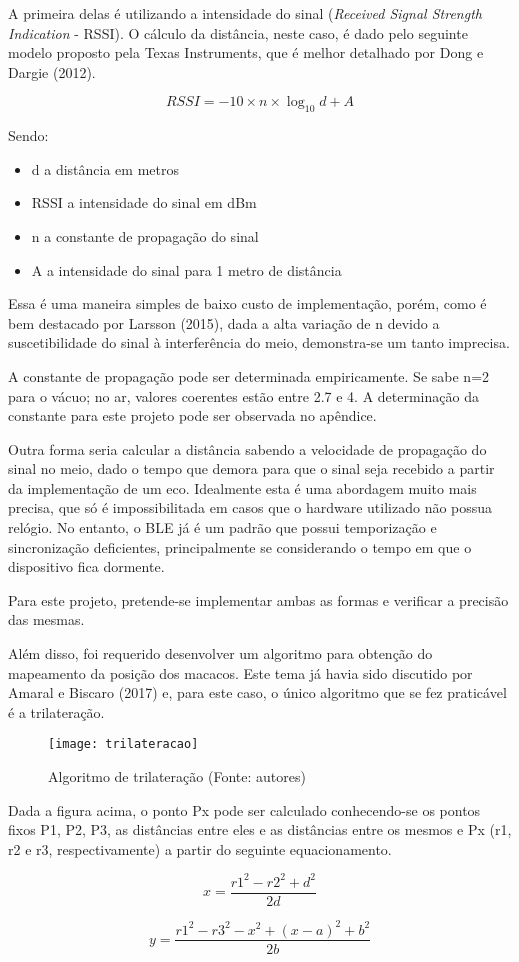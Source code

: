 A primeira delas é utilizando a intensidade do sinal (\textit{Received Signal Strength Indication} - RSSI). O cálculo da distância, neste caso, é dado pelo seguinte modelo proposto pela Texas Instruments, que é melhor detalhado por Dong e Dargie (2012).

\begin{equation}
RSSI = -10 \times n \times \log_{10} d + A
\end{equation}

Sendo:
\begin{itemize}
\item d a distância em metros
\item RSSI a intensidade do sinal em dBm
\item n a constante de propagação do sinal
\item A a intensidade do sinal para 1 metro de distância
\end{itemize}

Essa é uma maneira simples de baixo custo de implementação, porém, como é bem destacado por Larsson (2015), dada a alta variação de n devido a suscetibilidade do sinal à interferência do meio, demonstra-se um tanto imprecisa.

A constante de propagação pode ser determinada empiricamente. Se sabe n=2 para o vácuo; no ar, valores coerentes estão entre 2.7 e 4. A determinação da constante para este projeto pode ser observada no apêndice.

Outra forma seria calcular a distância sabendo a velocidade de propagação do sinal no meio, dado o tempo que demora para que o sinal seja recebido a partir da implementação de um eco. Idealmente esta é uma abordagem muito mais precisa, que só é impossibilitada em casos que o hardware utilizado não possua relógio. No entanto, o BLE já é um padrão que possui temporização e sincronização deficientes, principalmente se considerando o tempo em que o dispositivo fica dormente.

Para este projeto, pretende-se implementar ambas as formas e verificar a precisão das mesmas.

Além disso, foi requerido desenvolver um algoritmo para obtenção do mapeamento da posição dos macacos. Este tema já havia sido discutido por Amaral e Biscaro (2017) e, para este caso, o único algoritmo que se fez praticável é a trilateração.

\begin{figure}[ht]
  \centering
    \texttt{[image: trilateracao]}
  \caption{Algoritmo de trilateração (Fonte: autores)}
\end{figure}
\FloatBarrier

Dada a figura acima, o ponto Px pode ser calculado conhecendo-se os pontos fixos P1, P2, P3, as distâncias entre eles e as distâncias entre os mesmos e Px (r1, r2 e r3, respectivamente) a partir do seguinte equacionamento.

\begin{equation}
x = \dfrac{r1^2 - r2^2 + d^2}{2d}
\end{equation}

\begin{equation}
y = \dfrac{r1^2 - r3^2 - x^2 + (x - a)^2 + b^2}{2b}
\end{equation}
